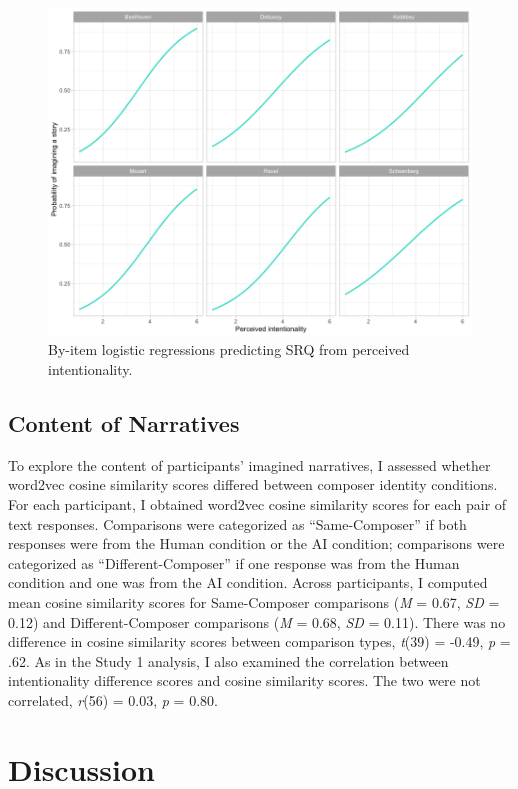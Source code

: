\documentclass[12pt,twoside]{reedthesis}
\begin{document}
\begin{figure}[h!tbp]
	\centering
	\includegraphics[scale=0.5]{intention_SRQ_by_piece.png}
	\caption{By-item logistic regressions predicting SRQ from perceived intentionality.}
	\label{fig-intention-SRQ}
	\end{figure}

\subsection*{Content of Narratives}
To explore the content of participants’ imagined narratives, I assessed whether word2vec cosine similarity scores differed between composer identity conditions. For each participant, I obtained word2vec cosine similarity scores for each pair of text responses. Comparisons were categorized as “Same-Composer” if both responses were from the Human condition or the AI condition; comparisons were categorized as “Different-Composer” if one response was from the Human condition and one was from the AI condition. Across participants, I computed mean cosine similarity scores for Same-Composer comparisons (\emph{M} = 0.67, \emph{SD} = 0.12) and Different-Composer comparisons (\emph{M} = 0.68, \emph{SD} = 0.11). There was no difference in cosine similarity scores between comparison types, \emph{t}(39) = -0.49, \emph{p} = .62. As in the Study 1 analysis, I also examined the correlation between intentionality difference scores and cosine similarity scores. The two were not correlated, \emph{r}(56) = 0.03, \emph{p} = 0.80.

\section*{Discussion}
\end{document}
